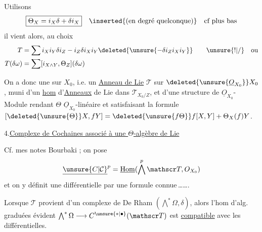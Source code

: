 Utilisons
\[
\boxed{\Theta_X=i_X\delta+\delta i_X}\quad\inserted{\text{(en degré quelconque)}}\quad\text{cf plus bas}
\]
il vient alors, au choix
\[
\begin{aligned}
T&=\sum i_X i_Y\delta i_Z-i_Z\delta i_X i_Y\deleted{\unsure{-\delta i_Z i_X i_Y}}\qquad \unsure{!|/}\quad\text{ou}\\
T(\delta\omega)&=\sum[i_{X\wedge Y},\Theta_Z](\delta\omega)
\end{aligned}
\]

On a donc une  sur $X_0$, i.e. un \uline{Anneau de Lie}  $\mathscr T$ sur $\deleted{\unsure{\underline O_{X_0}}}X_0$, muni d'un \uline{hom}  d'\uline{Anneaux} de Lie dans $\mathscr T_{X_0/Z}$, et d'une structure de $\underline O_{X_0}$-Module rendant $\Theta$ $\underline O_{X_0}$-linéaire et satisfaisant la formule $[\deleted{\unsure{\Theta}}X,fY]=\deleted{\unsure{f\Theta}}f[X,Y]+\Theta_X(f)Y$.

4.\quad \uline{Complexe de Cochaines associé à une $\Theta$-algèbre de Lie} 

Cf. mes notes Bourbaki ; on pose 
\[
\underline{\unsure{C|\mathcal C}}^p=\underline{\mathrm{Hom}}(\bigwedge^p\mathscr T,O_{X_0})
\]
et on y définit une différentielle par une formule connue\,\ldots\ldots.

Lorsque $\mathscr T$ provient d'un complexe de De Rham $(\bigwedge^*\Omega,\delta)$, alors l'hom d'alg. graduées évident $\bigwedge^*\Omega\longrightarrow C^{\unsure{*|\bullet}}(\mathscr T)$ est \uline{compatible} avec les  différentielles.


